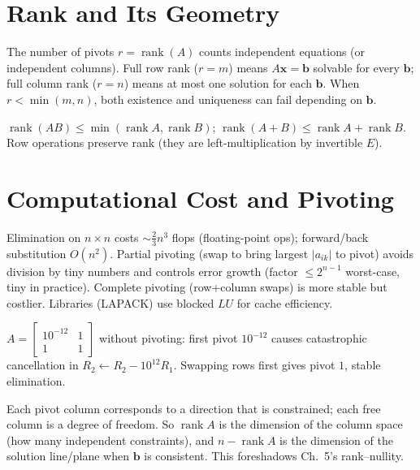 \section{Rank and Its Geometry}
\label{sec:rank-geom}
The number of pivots $r=\operatorname{rank}(A)$ counts independent equations (or independent columns). Full row rank ($r=m$) means $A\mathbf{x}=\mathbf{b}$ solvable for every $\mathbf{b}$; full column rank ($r=n$) means at most one solution for each $\mathbf{b}$. When $r<\min(m,n)$, both existence and uniqueness can fail depending on $\mathbf{b}$.

\begin{theorem}
$\operatorname{rank}(AB)\le\min(\operatorname{rank}A,\operatorname{rank}B)$; $\operatorname{rank}(A+B)\le\operatorname{rank}A+\operatorname{rank}B$. Row operations preserve rank (they are left-multiplication by invertible $E$).
\end{theorem}

\section{Computational Cost and Pivoting}
\label{sec:pivot-cost}
Elimination on $n\times n$ costs $\sim\frac23n^3$ flops (floating-point ops); forward/back substitution $O(n^2)$. Partial pivoting (swap to bring largest $|a_{ik}|$ to pivot) avoids division by tiny numbers and controls error growth (factor $\le2^{n-1}$ worst-case, tiny in practice). Complete pivoting (row+column swaps) is more stable but costlier. Libraries (LAPACK) use blocked $LU$ for cache efficiency.

\begin{example}
$A=\begin{bmatrix}10^{-12}&1\\1&1\end{bmatrix}$ without pivoting: first pivot $10^{-12}$ causes catastrophic cancellation in $R_2\gets R_2-10^{12}R_1$. Swapping rows first gives pivot $1$, stable elimination.
\end{example}



\begin{remark}
Each pivot column corresponds to a direction that is constrained; each free column is a degree of freedom. So $\operatorname{rank}A$ is the dimension of the column space (how many independent constraints), and $n-\operatorname{rank}A$ is the dimension of the solution line/plane when $\mathbf{b}$ is consistent. This foreshadows Ch.~5's rank--nullity.
\end{remark}

